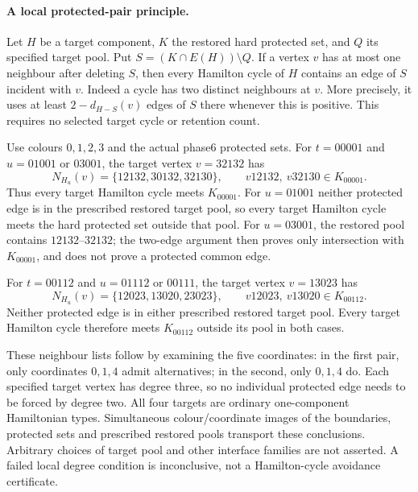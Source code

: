\paragraph{A local protected-pair principle.}
Let $H$ be a target component, $K$ the restored hard protected set,
and $Q$ its specified target pool. Put $S=(K\cap E(H))\setminus Q$.
If a vertex $v$ has at most one neighbour after deleting $S$, then
every Hamilton cycle of $H$ contains an edge of $S$ incident with $v$.
Indeed a cycle has two distinct neighbours at $v$. More precisely,
it uses at least $2-d_{H-S}(v)$ edges of $S$ there whenever this is
positive. This requires no selected target cycle or retention count.

Use colours $0,1,2,3$ and the actual phase6 protected sets. For
$t=00001$ and $u=01001$ or $03001$, the target vertex $v=32132$ has
\[
N_{H_u}(v)=\{12132,30132,32130\},\qquad
v12132,\ v32130\in K_{00001}.
\]
Thus every target Hamilton cycle meets $K_{00001}$.
For $u=01001$ neither protected edge is in the prescribed restored
target pool, so every target Hamilton cycle meets the hard protected
set outside that pool. For $u=03001$, the restored pool contains
$12132$--$32132$; the two-edge argument then proves only intersection
with $K_{00001}$, and does not prove a protected common edge.

For $t=00112$ and $u=01112$ or $00111$, the target vertex $v=13023$
has
\[
N_{H_u}(v)=\{12023,13020,23023\},\qquad
v12023,\ v13020\in K_{00112}.
\]
Neither protected edge is in either prescribed restored target pool.
Every target Hamilton cycle therefore meets $K_{00112}$ outside
its pool in both cases.

These neighbour lists follow by examining the five coordinates:
in the first pair, only coordinates $0,1,4$ admit alternatives;
in the second, only $0,1,4$ do. Each specified target vertex has degree three, so
no individual protected edge needs to be forced by degree two.
All four targets are ordinary one-component Hamiltonian types.
Simultaneous colour/coordinate images of the boundaries, protected
sets and prescribed restored pools transport these conclusions.
Arbitrary choices of target pool and other interface families are
not asserted. A failed local degree condition is inconclusive,
not a Hamilton-cycle avoidance certificate.
